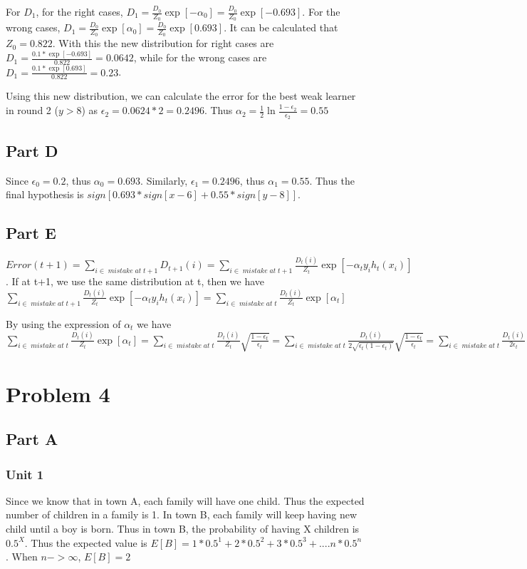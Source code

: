\noindent For $D_1$, for the right cases, $D_{1}=\frac{D_0}{Z_0}\exp[-\alpha_0]=\frac{D_0}{Z_0}\exp[-0.693]$. For the wrong cases, $D_{1}=\frac{D_0}{Z_0}\exp[\alpha_0]=\frac{D_0}{Z_0}\exp[0.693]$. It can be calculated that $Z_0=0.822$. With this the new distribution for right cases are $D_{1}=\frac{0.1*\exp[-0.693]}{0.822}=0.0642$, while for the wrong cases are $D_{1}=\frac{0.1*\exp[0.693]}{0.822}=0.23$.

\noindent Using this new distribution, we can calculate the error for the best weak learner in round 2 ($y>8$) as $\epsilon_{2}=0.0624*2=0.2496$. Thus $\alpha_2=\frac{1}{2}\ln{\frac{1-\epsilon_2}{\epsilon_2}}=0.55$
\subsection{Part D}
Since $\epsilon_{0}=0.2$, thus $\alpha_{0}=0.693$. Similarly, $\epsilon_{1}=0.2496$, thus $\alpha_{1}=0.55$. Thus the final hypothesis is $sign[0.693*sign[x-6]+0.55*sign[y-8]]$.

\subsection{Part E}
$Error(t+1)=\sum_{i\in\;mistake\;at\;t+1}D_{t+1}(i)=\sum_{i\in\;mistake\;at\;t+1}\frac{D_t(i)}{Z_t}\exp[-\alpha_t y_i h_t(x_i)]$. If at t+1, we use the same distribution at t, then we have
$\sum_{i\in\;mistake\;at\;t+1}\frac{D_t(i)}{Z_t}\exp[-\alpha_t y_i h_t(x_i)]= \sum_{i\in\;mistake\;at\;t}\frac{D_t(i)}{Z_t}\exp[\alpha_t]$ 

By using the expression of $\alpha_t$ we have $\sum_{i\in\;mistake\;at\;t}\frac{D_t(i)}{Z_t}\exp[\alpha_t]=\sum_{i\in\;mistake\;at\;t}\frac{D_t(i)}{Z_t}\sqrt{\frac{1-\epsilon_t}{\epsilon_t}}=\sum_{i\in\;mistake\;at\;t}\frac{D_t(i)}{2\sqrt{\epsilon_t(1-\epsilon_t)}}\sqrt{\frac{1-\epsilon_t}{\epsilon_t}}=\sum_{i\in\;mistake\;at\;t}\frac{D_t(i)}{2\epsilon_t}=\frac{1}{2\epsilon_t}\sum_{i\in\;mistake\;at\;t}D_t(i)=\frac{1}{2}$

\section{Problem 4}
\subsection{Part A}
\subsubsection{Unit 1}
Since we know that in town A, each family will have one child. Thus the expected number of children in a family is 1. In town B, each family will keep having new child until a boy is born. Thus in town B, the probability of having X children is $0.5^X$. Thus the expected value is $E[B]=1*0.5^1+2*0.5^2+3*0.5^3+....n*0.5^n$. When $n->\infty$, $E[B]=2$

